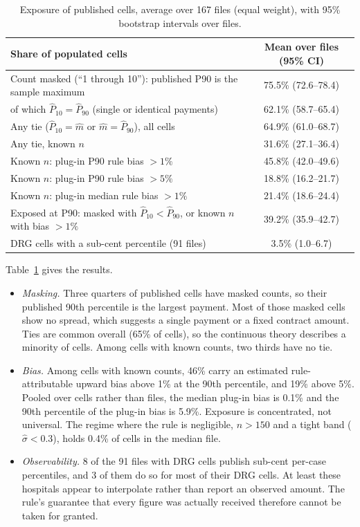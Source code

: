 \documentclass[11pt]{article}
\theoremstyle{remark}
\begin{document}
\begin{table}[t]
\centering\small
\caption{Exposure of published cells, average over 167 files (equal weight), with 95\% bootstrap intervals over files.}
\label{tab:exposure}
\begin{tabular}{lc}
\toprule
Share of populated cells & Mean over files (95\% CI)\\
\midrule
Count masked (``1 through 10''): published P90 is the sample maximum & 75.5\% (72.6--78.4)\\
\quad of which $\hat P_{10}=\hat P_{90}$ (single or identical payments) & 62.1\% (58.7--65.4)\\
Any tie ($\hat P_{10}=\hat m$ or $\hat m=\hat P_{90}$), all cells & 64.9\% (61.0--68.7)\\
Any tie, known $n$ & 31.6\% (27.1--36.4)\\
Known $n$: plug-in P90 rule bias $>1\%$ & 45.8\% (42.0--49.6)\\
Known $n$: plug-in P90 rule bias $>5\%$ & 18.8\% (16.2--21.7)\\
Known $n$: plug-in median rule bias $>1\%$ & 21.4\% (18.6--24.4)\\
Exposed at P90: masked with $\hat P_{10}<\hat P_{90}$, or known $n$ with bias $>1\%$ & 39.2\% (35.9--42.7)\\
DRG cells with a sub-cent percentile (91 files) & 3.5\% (1.0--6.7)\\
\bottomrule
\end{tabular}
\end{table}

Table~\ref{tab:exposure} gives the results.
\begin{itemize}
\item \emph{Masking.} Three quarters of published cells have masked counts, so their published 90th percentile is the largest payment. Most of those masked cells show no spread, which suggests a single payment or a fixed contract amount. Ties are common overall (65\% of cells), so the continuous theory describes a minority of cells. Among cells with known counts, two thirds have no tie.
\item \emph{Bias.} Among cells with known counts, 46\% carry an estimated rule-attributable upward bias above 1\% at the 90th percentile, and 19\% above 5\%. Pooled over cells rather than files, the median plug-in bias is 0.1\% and the 90th percentile of the plug-in bias is 5.9\%. Exposure is concentrated, not universal. The regime where the rule is negligible, $n>150$ and a tight band ($\hat\sigma<0.3$), holds 0.4\% of cells in the median file.
\item \emph{Observability.} 8 of the 91 files with DRG cells publish sub-cent per-case percentiles, and 3 of them do so for most of their DRG cells. At least these hospitals appear to interpolate rather than report an observed amount. The rule's guarantee that every figure was actually received therefore cannot be taken for granted.
\end{itemize}
\end{document}

